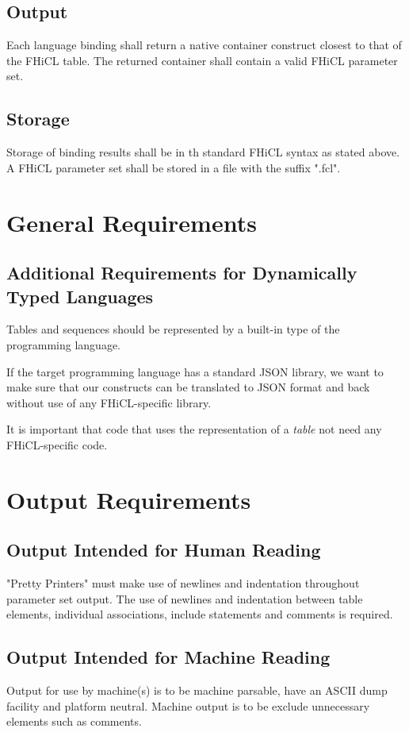\documentclass{memarticle}
\begin{document}
	\subsection{Output}
		Each language binding shall return a native container construct closest to that of the FHiCL table.
		The returned container shall contain a valid FHiCL parameter set.

	\subsection{Storage}	
		Storage of binding results shall be in th standard FHiCL syntax as stated above.
		A FHiCL parameter set shall be stored in a file with the suffix ".fcl".
		
\section{General Requirements}
	\subsection{Additional Requirements for Dynamically Typed Languages}
		Tables and sequences should be represented by a built-in type of the
		programming language.

		If the target programming language has a standard JSON library, we
		want to make sure that our constructs can be translated to JSON format
		and back without use of any FHiCL-specific library.

		It is important that code that uses the representation of a
		\emph{table} not need any FHiCL-specific code.

\section{Output Requirements}

	\subsection{Output Intended for Human Reading}
  		"Pretty Printers" must make use of newlines and indentation throughout parameter set output.
		The use of newlines and indentation between table elements, individual associations, include statements
		and comments is required.
	\subsection{Output Intended for Machine Reading}
		Output for use by machine(s) is to be machine parsable,
		have an ASCII dump facility and platform neutral.
  		Machine output is to be exclude unnecessary elements such as comments.
\end{document}
